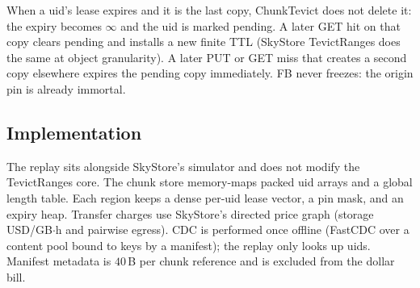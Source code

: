 When a uid's lease expires and it is the last copy, ChunkTevict does not delete it: the expiry becomes $\infty$ and the uid is marked pending.
A later {GET} hit on that copy clears pending and installs a new finite {TTL} (SkyStore TevictRanges does the same at object granularity).
A later {PUT} or {GET} miss that creates a second copy elsewhere expires the pending copy immediately.
{FB} never freezes: the origin pin is already immortal.

\subsection{Implementation}

The replay sits alongside SkyStore's simulator and does not modify the TevictRanges core.
The chunk store memory-maps packed uid arrays and a global length table.
Each region keeps a dense per-uid lease vector, a pin mask, and an expiry heap.
Transfer charges use SkyStore's directed price graph (storage {USD}/{GB}$\cdot$h and pairwise egress).
{CDC} is performed once offline (Fast{CDC} over a content pool bound to keys by a manifest); the replay only looks up uids.
Manifest metadata is $40$\,B per chunk reference and is excluded from the dollar bill.
